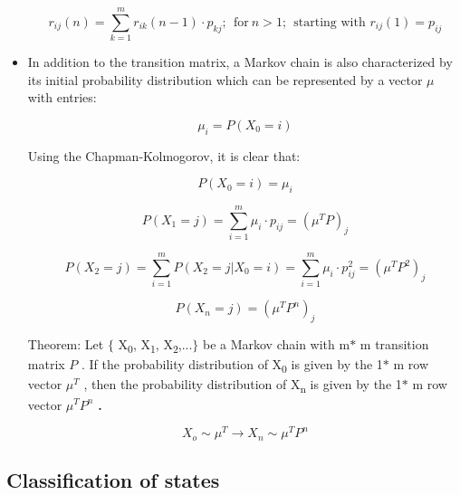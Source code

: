 \documentclass[12pt]{report}
\renewcommand{\_}{\kern-1.5pt\textunderscore\kern-1.5pt}
\begin{document}
\begin{itemize}
 \[ r_{ij} \left( n \right) = \sum _{k=1}^{m}r_{ik} \left( n-1 \right)  \cdot p_{kj};~~\mathrm{for~}n>1;~~\mathrm{\text{starting with }}r_{ij} \left( 1 \right) =p_{ij} \] \par

	\item In addition to the transition matrix, a Markov chain is also characterized by its initial probability distribution which can be represented by a vector  \(  \mu  \)  with entries:\par

 \[  \mu _{i}=P \left( X_{0}=i \right)  \] \par

Using the Chapman-Kolmogorov, it is clear that:\par

 \[ P \left( X_{0}=i \right) = \mu _{i} \] \par

 \[ P \left( X_{1}=j \right) = \sum _{i=1}^{m} \mu _{i} \cdot p_{ij}= \left(  \mu ^{T}P \right) _{j} \] \par

 \[ P \left( X_{2}=j \right) = \sum _{i=1}^{m}P \left( X_{2}=j \vert X_{0}=i \right) = \sum _{i=1}^{m} \mu _{i} \cdot p_{ij}^{2}= \left(  \mu ^{T}P^{2} \right) _{j} \] \par

 \[ P \left( X_{n}=j \right) = \left(  \mu ^{T}P^{n} \right) _{j} \] \par

Theorem: Let $ \{ $ X\textsubscript{0}, X\textsubscript{1}, X\textsubscript{2},...$ \} $  be a Markov chain with m$\ast$ m transition matrix  \( P \) . If the probability distribution of X\textsubscript{0} is given by the 1$\ast$ m row vector  \(  \mu ^{T} \) , then the probability distribution of X\textsubscript{n} is given by the 1$\ast$ m row vector  \(  \mu ^{T}P^{n} \) \textbf{.}\par

 \[ X_{o} \sim  \mu ^{T}  \rightarrow  X_{n} \sim  \mu ^{T}P^{n} \] \par


\end{itemize}\subsection*{Classification of states}
\end{document}
